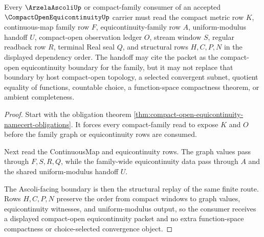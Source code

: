 \begin{theorem}
\label{thm:compact-open-equicontinuity-ascoli-handoff}
Every $\ArzelaAscoliUp$ or compact-family consumer of an accepted $\CompactOpenEquicontinuityUp$ carrier must read the compact metric row $K$, continuous-map family row $F$, equicontinuity-family row $A$, uniform-modulus handoff $U$, compact-open observation ledger $O$, stream window $S$, regular readback row $R$, terminal Real seal $Q$, and structural rows $H,C,P,N$ in the displayed dependency order. The handoff may cite the packet as the compact-open equicontinuity boundary for the family, but it may not replace that boundary by host compact-open topology, a selected convergent subnet, quotient equality of functions, countable choice, a function-space compactness theorem, or ambient completeness.
\end{theorem}
\begin{proof}
Start with the obligation theorem \autoref{thm:compact-open-equicontinuity-namecert-obligations}. It forces every compact-family read to expose $K$ and $O$ before the family graph or equicontinuity rows are consumed.

Next read the ContinuousMap and equicontinuity rows. The graph values pass through $F,S,R,Q$, while the family-wide equicontinuity data pass through $A$ and the shared uniform-modulus handoff $U$.

The Ascoli-facing boundary is then the structural replay of the same finite route. Rows $H,C,P,N$ preserve the order from compact windows to graph values, equicontinuity witnesses, and uniform-modulus output, so the consumer receives a displayed compact-open equicontinuity packet and no extra function-space compactness or choice-selected convergence object.
\end{proof}



